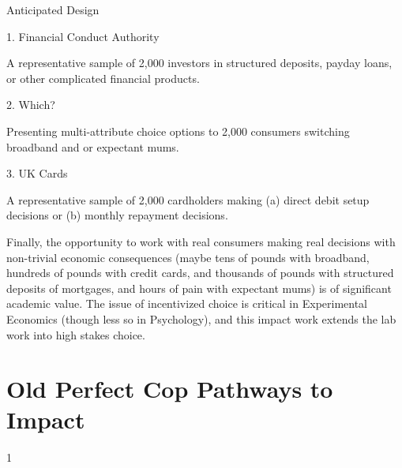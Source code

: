 \documentclass[11pt, a4paper]{article}
\begin{document}
Anticipated Design

1. Financial Conduct
Authority

A representative sample of 2,000 investors in structured
deposits, payday loans, or other complicated financial
products.

2. Which?

Presenting multi-attribute choice options to 2,000
consumers switching broadband and or expectant mums.

3. UK Cards

A representative sample of 2,000 cardholders making (a)
direct debit setup decisions or (b) monthly repayment
decisions.

Finally, the opportunity to work with real consumers making real decisions with non-trivial
economic consequences (maybe tens of pounds with broadband, hundreds of pounds with
credit cards, and thousands of pounds with structured deposits of mortgages, and hours of
pain with expectant mums) is of significant academic value. The issue of incentivized choice
is critical in Experimental Economics (though less so in Psychology), and this impact work
extends the lab work into high stakes choice.

\section{Old Perfect Cop Pathways to Impact}


1
\end{document}
